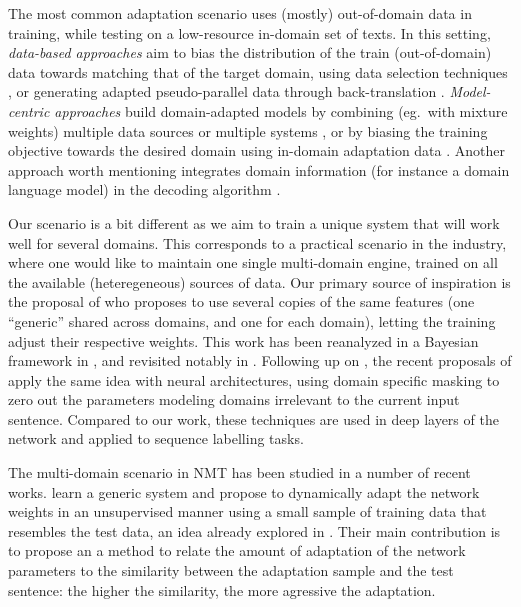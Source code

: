 \documentclass[11pt,a4paper]{article}
\begin{document}
The most common adaptation scenario uses (mostly) out-of-domain data in training, while testing on a low-resource in-domain set of texts. In this setting, \emph{data-based approaches} aim to bias the distribution of the train (out-of-domain) data towards matching that of the target domain, using data selection techniques \cite{Moore2010selection,Axelrod2011domain,Duh2013selection}, or generating adapted pseudo-parallel data through back-translation  \cite{Utiyama2003measure,Wang2014neural,Wang2016connecting,Sennrich2016Mono}. \emph{Model-centric approaches} build domain-adapted models by combining (eg.\ with mixture weights) multiple data sources or multiple systems \cite{Foster07mixture,Wang17instance}, or by biasing the training objective towards the desired domain using in-domain adaptation data \cite{Luong2015SNMT,Freitag2016FastDA,Chen17costweighting}. Another approach worth mentioning integrates domain information (for instance a domain language model) in the decoding algorithm \cite{Gulcehre2016monolingual}.

Our scenario is a bit different as we aim to train a unique system that will work well for several domains. This corresponds to a practical scenario in the industry, where one would like to maintain one single multi-domain engine, trained on all the available (heteregeneous) sources of data. Our primary source of inspiration is the proposal of \citet{Daume07frustratingly} who proposes to use several copies of the same features (one ``generic'' shared across domains, and one for each domain), letting the training adjust their respective weights. This work has been reanalyzed in a Bayesian framework in \cite{Finkel09hierarchical}, and revisited notably in \cite{Chang10necessity}. Following up on \cite{Yang15unified}, the recent proposals of \cite{Peng17multitask} apply the same idea with neural architectures, using domain specific masking to zero out the parameters modeling domains irrelevant to the current input sentence. Compared to our work, these techniques are used in deep layers of the network and applied to sequence labelling tasks.

The multi-domain scenario in NMT has been studied in a number of recent works. \citet{Farajian17multidomain} learn a generic system and propose to dynamically adapt the network weights in an unsupervised manner using a small sample of training data that resembles the test data, an idea already explored in \cite{Sennrich13multidomain}. Their main contribution is to propose an a method to relate the amount of adaptation of the network parameters to the similarity between the adaptation sample and the test sentence: the higher the similarity, the more agressive the adaptation.
\end{document}
